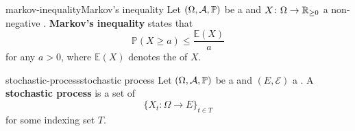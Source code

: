 \begin{topic}{markov-inequality}{Markov's inequality}
    Let $(\Omega, \mathcal{A}, \mathbb{P})$ be a  and $X \colon \Omega \to \mathbb{R}_{\ge 0}$ a non-negative . \textbf{Markov's inequality} states that
    \[ \mathbb{P}(X \ge a) \le \frac{\mathbb{E}(X)}{a} \]
    for any $a > 0$, where $\mathbb{E}(X)$ denotes the  of $X$.
\end{topic}

\begin{topic}{stochastic-process}{stochastic process}
    Let $(\Omega, \mathcal{A}, \mathbb{P})$ be a  and $(E, \mathcal{E})$ a . A \textbf{stochastic process} is a set of 
    \[ \{ X_t \colon \Omega \to E \}_{t \in T} \]
    for some indexing set $T$.
\end{topic}
